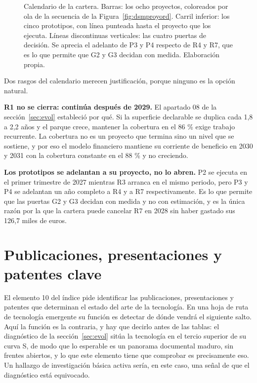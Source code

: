 \documentclass[11pt,letterpaper]{article}
\begin{document}
\begin{figure}[ht]
  \caption{Calendario de la cartera. Barras: los ocho proyectos, coloreados
  por ola de la secuencia de la Figura~\ref{fig:dsmproyord}. Carril inferior:
  los cinco prototipos, con línea punteada hasta el proyecto que los ejecuta.
  Líneas discontinuas verticales: las cuatro puertas de decisión. Se aprecia
  el adelanto de P3 y P4 respecto de R4 y R7, que es lo que permite que G2 y
  G3 decidan con medida. Elaboración propia.}
  \label{fig:gantt}
\end{figure}

Dos rasgos del calendario merecen justificación, porque ninguno es la opción
natural.

\textbf{R1 no se cierra: continúa después de 2029.} El apartado 08 de la
sección~\ref{sec:evol} estableció por qué. Si la superficie declarable se
duplica cada 1,8 a 2,2 años y el parque crece, mantener la cobertura en el
86 \% exige trabajo recurrente. La cobertura no es un proyecto que termina
sino un nivel que se sostiene, y por eso el modelo financiero mantiene su
corriente de beneficio en 2030 y 2031 con la cobertura constante en el 88 \% y
no creciendo.

\textbf{Los prototipos se adelantan a su proyecto, no lo abren.} P2 se ejecuta
en el primer trimestre de 2027 mientras R3 arranca en el mismo periodo, pero
P3 y P4 se adelantan un año completo a R4 y a R7 respectivamente. Es lo que
permite que las puertas G2 y G3 decidan con medida y no con estimación, y es
la única razón por la que la cartera puede cancelar R7 en 2028 sin haber
gastado sus 126,7 miles de euros.

\section{Publicaciones, presentaciones y patentes clave}
\label{sec:publica}

El elemento 10 del índice pide identificar las publicaciones, presentaciones y
patentes que determinan el estado del arte de la tecnología. En una hoja de
ruta de tecnología emergente su función es detectar de dónde vendrá el
siguiente salto. Aquí la función es la contraria, y hay que decirlo antes de
las tablas: el diagnóstico de la sección~\ref{sec:evol} sitúa la tecnología en
el tercio superior de su curva S, de modo que lo esperable es un panorama
documental maduro, sin frentes abiertos, y lo que este elemento tiene que
comprobar es precisamente eso. Un hallazgo de investigación básica activa
sería, en este caso, una señal de que el diagnóstico está equivocado.
\end{document}
